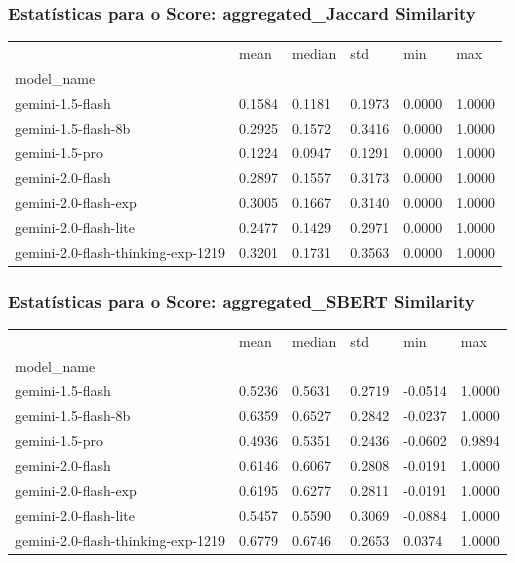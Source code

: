 \documentclass{article}%
\begin{document}
\subsubsection*{Estatísticas para o Score: aggregated\_Jaccard Similarity}%
\begin{table}[H]%
\centering%
\begin{tabular}{llllll}
\toprule
 & mean & median & std & min & max \\
model_name &  &  &  &  &  \\
\midrule
gemini-1.5-flash & 0.1584 & 0.1181 & 0.1973 & 0.0000 & 1.0000 \\
gemini-1.5-flash-8b & 0.2925 & 0.1572 & 0.3416 & 0.0000 & 1.0000 \\
gemini-1.5-pro & 0.1224 & 0.0947 & 0.1291 & 0.0000 & 1.0000 \\
gemini-2.0-flash & 0.2897 & 0.1557 & 0.3173 & 0.0000 & 1.0000 \\
gemini-2.0-flash-exp & 0.3005 & 0.1667 & 0.3140 & 0.0000 & 1.0000 \\
gemini-2.0-flash-lite & 0.2477 & 0.1429 & 0.2971 & 0.0000 & 1.0000 \\
gemini-2.0-flash-thinking-exp-1219 & 0.3201 & 0.1731 & 0.3563 & 0.0000 & 1.0000 \\
\bottomrule
\end{tabular}
%
\end{table}%
\vspace{0.5cm}%
\subsubsection*{Estatísticas para o Score: aggregated\_SBERT Similarity}%
\begin{table}[H]%
\centering%
\begin{tabular}{llllll}
\toprule
 & mean & median & std & min & max \\
model_name &  &  &  &  &  \\
\midrule
gemini-1.5-flash & 0.5236 & 0.5631 & 0.2719 & -0.0514 & 1.0000 \\
gemini-1.5-flash-8b & 0.6359 & 0.6527 & 0.2842 & -0.0237 & 1.0000 \\
gemini-1.5-pro & 0.4936 & 0.5351 & 0.2436 & -0.0602 & 0.9894 \\
gemini-2.0-flash & 0.6146 & 0.6067 & 0.2808 & -0.0191 & 1.0000 \\
gemini-2.0-flash-exp & 0.6195 & 0.6277 & 0.2811 & -0.0191 & 1.0000 \\
gemini-2.0-flash-lite & 0.5457 & 0.5590 & 0.3069 & -0.0884 & 1.0000 \\
gemini-2.0-flash-thinking-exp-1219 & 0.6779 & 0.6746 & 0.2653 & 0.0374 & 1.0000 \\
\bottomrule
\end{tabular}
%
\end{table}%
\vspace{0.5cm}%
\end{document}
